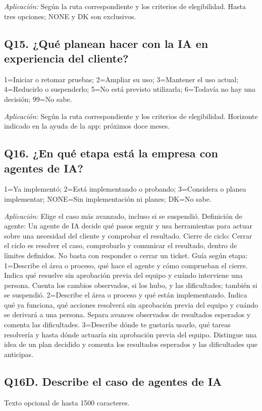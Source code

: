 \documentclass[12pt,letterpaper]{article}
\begin{document}
\emph{Aplicación:} Según la ruta correspondiente y los criterios de elegibilidad. Hasta tres opciones; NONE y DK son exclusivos.

\subsection*{Q15. ¿Qué planean hacer con la IA en experiencia del cliente?}
1=Iniciar o retomar pruebas; 2=Ampliar su uso; 3=Mantener el uso actual; 4=Reducirlo o suspenderlo; 5=No está previsto utilizarla; 6=Todavía no hay una decisión; 99=No sabe.

\emph{Aplicación:} Según la ruta correspondiente y los criterios de elegibilidad. Horizonte indicado en la ayuda de la app: próximos doce meses.

\subsection*{Q16. ¿En qué etapa está la empresa con agentes de IA?}
1=Ya implementó; 2=Está implementando o probando; 3=Considera o planea implementar; NONE=Sin implementación ni planes; DK=No sabe.

\emph{Aplicación:} Elige el caso más avanzado, incluso si se suspendió. Definición de agente: Un agente de IA decide qué pasos seguir y usa herramientas para actuar sobre una necesidad del cliente y comprobar el resultado. Cierre de ciclo: Cerrar el ciclo es resolver el caso, comprobarlo y comunicar el resultado, dentro de límites definidos. No basta con responder o cerrar un ticket. Guía según etapa: 1=Describe el área o proceso, qué hace el agente y cómo comprueban el cierre. Indica qué resuelve sin aprobación previa del equipo y cuándo interviene una persona. Cuenta los cambios observados, si los hubo, y las dificultades; también si se suspendió. 2=Describe el área o proceso y qué están implementando. Indica qué ya funciona, qué acciones resolverá sin aprobación previa del equipo y cuándo se derivará a una persona. Separa avances observados de resultados esperados y comenta las dificultades. 3=Describe dónde te gustaría usarlo, qué tareas resolvería y hasta dónde actuaría sin aprobación previa del equipo. Distingue una idea de un plan decidido y comenta los resultados esperados y las dificultades que anticipas.

\subsection*{Q16D. Describe el caso de agentes de IA}
Texto opcional de hasta 1500 caracteres.
\end{document}
